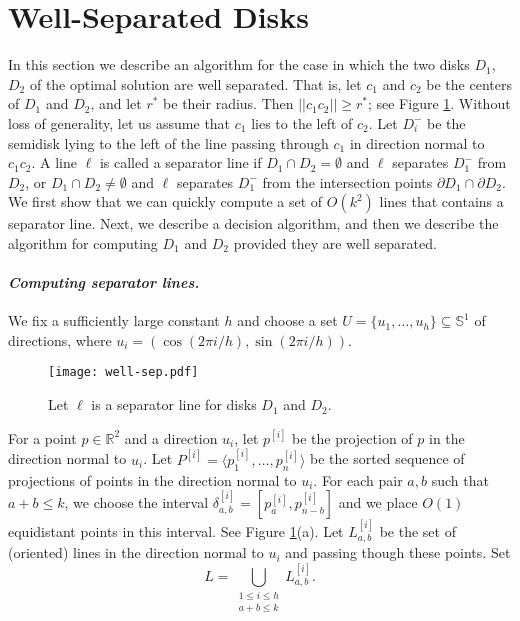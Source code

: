 \documentclass[11pt]{myclass}
\renewcommand{\b}[1]{\ensuremath{\mathbb{#1}}}
\begin{document}
\section{Well-Separated Disks}
In this section we describe an algorithm for the case in which the two disks $D_1$, $D_2$ of the optimal solution are well separated.  That is, let $c_1$ and $c_2$ be the centers of $D_1$ and $D_2$, and let $r^*$ be their radius.  Then $||c_1 c_2|| \geq r^*$; see Figure \ref{fig:well-sep}.  Without loss of generality, let us assume that $c_1$ lies to the left of $c_2$.
Let $D_i^-$ be the semidisk lying to the left of the line passing through $c_1$ in direction normal to $c_1 c_2$.  
A line $\ell$ is called a separator line if $D_1 \cap D_2 = \emptyset$ and $\ell$ separates $D_1^-$ from $D_2$, or $D_1 \cap D_2 \neq \emptyset$ and $\ell$ separates $D_1^-$ from the intersection points $\partial D_1 \cap \partial D_2$.  
We first show that we can quickly compute a set of $O(k^2)$ lines that contains a separator line.  Next, we describe a decision algorithm, and then we describe the algorithm for computing $D_1$ and $D_2$ provided they are well separated.  

\paragraph{\textbf{\emph{Computing separator lines.}}}
We fix a sufficiently large constant $h$ and choose a set $U = \{ u_1, \ldots, u_h\} \subseteq \b{S}^1$ of directions, where $u_i = \left(\cos (2\pi i / h), \sin (2 \pi i / h)\right)$.  

\begin{figure}
  \centering
  \texttt{[image: well-sep.pdf]}
\caption{\label{fig:well-sep} 
Let $\ell$ is a separator line for disks $D_1$ and $D_2$.
}
\end{figure}




For a point $p \in \b{R}^2$ and a direction $u_i$, let $p^{[i]}$ be the projection of $p$ in the direction normal to $u_i$.  Let $P^{[i]} = \langle p_1^{[i]}, \ldots, p_n^{[i]} \rangle$ be the sorted sequence of projections of points in the direction normal to $u_i$.  For each pair $a, b$ such that $a+b\leq k$, we choose the interval $\delta_{a,b}^{[i]} = [p_a^{[i]}, p_{n-b}^{[i]}]$ and we place $O(1)$ equidistant points in this interval.  See Figure \ref{fig:well-sep}(a).  Let $L_{a,b}^{[i]}$ be the set of (oriented) lines in the direction normal to $u_i$ and passing though these points.  Set 
$$
L = \bigcup_{\substack{1 \leq i \leq h \\ a+b \leq k}} L_{a,b}^{[i]}.
$$
\end{document}
